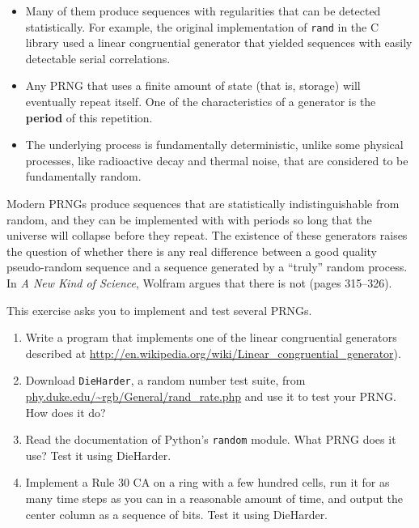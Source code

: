 \documentclass[10pt]{book}
\begin{document}
\begin{itemize}

\item Many of them produce sequences with regularities that
can be detected statistically.  For example, the original implementation
of {\tt rand} in the C library used a linear congruential generator
that yielded sequences with easily detectable serial correlations.

\item Any PRNG that uses a finite amount
of state (that is, storage) will eventually repeat itself.  One of the
characteristics of a generator is the {\bf period} of this
repetition.

\item The underlying process is fundamentally deterministic,
unlike some physical processes, like radioactive decay and
thermal noise, that are considered to be fundamentally
random.

\end{itemize}

Modern PRNGs produce sequences that are statistically
indistinguishable from random, and they can be implemented with with
periods so long that the universe will collapse before they repeat.
The existence of these generators raises the question of whether there
is any real difference between a good quality pseudo-random sequence
and a sequence generated by a ``truly'' random process.  In {\em A New
  Kind of Science}, Wolfram argues that there is not (pages 315--326).

\begin{exercise}

This exercise asks you to implement and test several PRNGs.

\begin{enumerate}

\item Write a program that implements one of the linear congruential
generators described at
\url{http://en.wikipedia.org/wiki/Linear_congruential_generator}).

\item Download {\tt DieHarder}, a random number test suite, from
\url{phy.duke.edu/~rgb/General/rand_rate.php} and use it to
test your PRNG.  How does it do?

\item Read the documentation of Python's {\tt random} module.
What PRNG does it use?  Test it using DieHarder.

\item Implement a Rule 30 CA on a ring with a few hundred cells,
run it for as many time steps as you can in a reasonable amount
of time, and output the center column as a sequence of bits.
Test it using DieHarder.

\end{enumerate}

\end{exercise}
\end{document}
